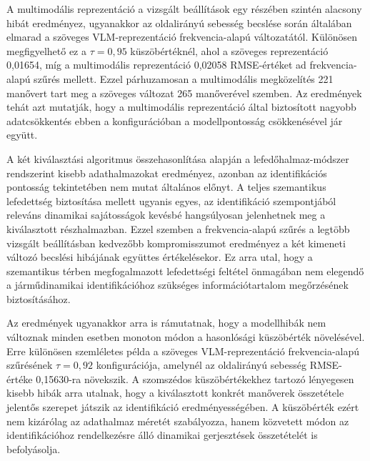 \documentclass[12pt,a4paper,onehalfspacing, oneside]{book} %
\begin{document}
A multimodális reprezentáció a vizsgált beállítások egy részében szintén alacsony hibát eredményez, ugyanakkor az oldalirányú sebesség becslése során általában elmarad a szöveges VLM-reprezentáció frekvencia-alapú változatától. Különösen megfigyelhető ez a $\tau=0{,}95$ küszöbértéknél, ahol a szöveges reprezentáció 0,01654, míg a multimodális reprezentáció 0,02058 RMSE-értéket ad frekvencia-alapú szűrés mellett. Ezzel párhuzamosan a multimodális megközelítés 221 manővert tart meg a szöveges változat 265 manőverével szemben. Az eredmények tehát azt mutatják, hogy a multimodális reprezentáció által biztosított nagyobb adatcsökkentés ebben a konfigurációban a modellpontosság csökkenésével jár együtt.

A két kiválasztási algoritmus összehasonlítása alapján a lefedőhalmaz-módszer rendszerint kisebb adathalmazokat eredményez, azonban az identifikációs pontosság tekintetében nem mutat általános előnyt. A teljes szemantikus lefedettség biztosítása mellett ugyanis egyes, az identifikáció szempontjából releváns dinamikai sajátosságok kevésbé hangsúlyosan jelenhetnek meg a kiválasztott részhalmazban. Ezzel szemben a frekvencia-alapú szűrés a legtöbb vizsgált beállításban kedvezőbb kompromisszumot eredményez a két kimeneti változó becslési hibájának együttes értékelésekor. Ez arra utal, hogy a szemantikus térben megfogalmazott lefedettségi feltétel önmagában nem elegendő a járműdinamikai identifikációhoz szükséges információtartalom megőrzésének biztosításához.

Az eredmények ugyanakkor arra is rámutatnak, hogy a modellhibák nem változnak minden esetben monoton módon a hasonlósági küszöbérték növelésével. Erre különösen szemléletes példa a szöveges VLM-reprezentáció frekvencia-alapú szűrésének $\tau=0{,}92$ konfigurációja, amelynél az oldalirányú sebesség RMSE-értéke 0,15630-ra növekszik. A szomszédos küszöbértékekhez tartozó lényegesen kisebb hibák arra utalnak, hogy a kiválasztott konkrét manőverek összetétele jelentős szerepet játszik az identifikáció eredményességében. A küszöbérték ezért nem kizárólag az adathalmaz méretét szabályozza, hanem közvetett módon az identifikációhoz rendelkezésre álló dinamikai gerjesztések összetételét is befolyásolja.
\end{document}

